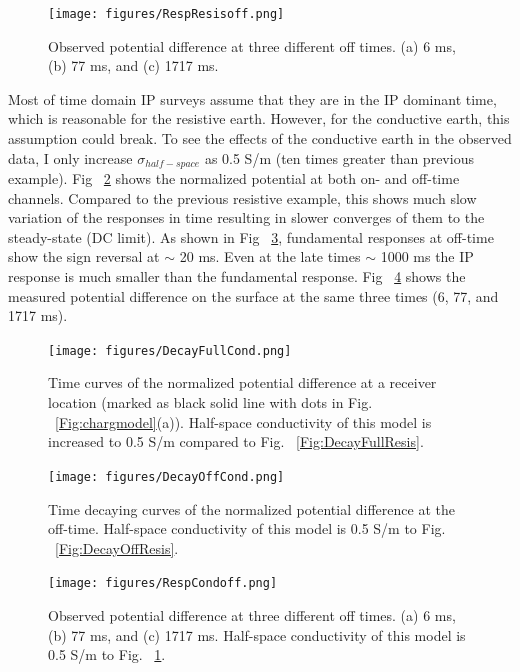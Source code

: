 \documentclass[letterpaper,11pt]{article}
\begin{document}
\begin{figure}[htb]
  \centering
  \texttt{[image: figures/RespResisoff.png]}
  \caption{Observed potential difference at three different off times. (a) 6 ms, (b) 77 ms, and (c) 1717 ms. }
  \label{Fig:RespResisoff}
\end{figure}

Most of time domain IP surveys assume that they are in the IP dominant time, which is reasonable for the resistive earth. 
However, for the conductive earth, this assumption could break. To see the effects of the conductive earth in the observed data, I only increase $\sigma_{half-space}$ as 0.5 S/m (ten times greater than previous example). Fig ~\ref{Fig:DecayFullCond} shows the normalized potential at both on- and off-time channels. Compared to the previous resistive example, this shows much slow variation of the responses in time resulting in slower converges of them to the steady-state (DC limit). As shown in Fig ~\ref{Fig:DecayOffCond}, fundamental responses at off-time show the sign reversal at $\sim$ 20 ms. Even at the late times $\sim$ 1000 ms the IP response is much smaller than the fundamental response. Fig ~\ref{Fig:RespCondoff} shows the measured potential difference on the surface at the same three times (6, 77, and 1717 ms). 

\begin{figure}[htb]
  \centering
  \texttt{[image: figures/DecayFullCond.png]}
  \caption{Time curves of the normalized potential difference at a receiver location (marked as black solid line with dots in Fig. ~\ref{Fig:chargmodel}(a)). Half-space conductivity of this model is increased to 0.5 S/m compared to Fig. ~\ref{Fig:DecayFullResis}.}
  \label{Fig:DecayFullCond}
\end{figure}

\begin{figure}[htb]
  \centering
  \texttt{[image: figures/DecayOffCond.png]}
  \caption{Time decaying curves of the normalized potential difference at the off-time. Half-space conductivity of this model is 0.5 S/m to Fig. ~\ref{Fig:DecayOffResis}.}
  \label{Fig:DecayOffCond}
\end{figure}

\begin{figure}[htb]
  \centering
  \texttt{[image: figures/RespCondoff.png]}
  \caption{Observed potential difference at three different off times. (a) 6 ms, (b) 77 ms, and (c) 1717 ms. Half-space conductivity of this model is 0.5 S/m to Fig. ~\ref{Fig:RespResisoff}.}
  \label{Fig:RespCondoff}
\end{figure}
\end{document}

